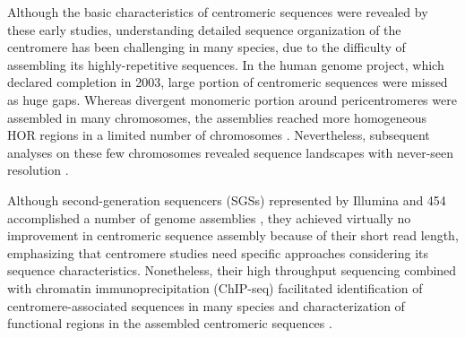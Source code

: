 Although the basic characteristics of centromeric sequences were revealed by these early studies, understanding detailed sequence organization of the centromere has been challenging in many species, due to the difficulty of assembling its highly-repetitive sequences. In the human genome project, which declared completion in 2003, large portion of centromeric sequences were missed as huge gaps. Whereas divergent monomeric portion around pericentromeres were assembled in many chromosomes, the assemblies reached more homogeneous HOR regions in a limited number of chromosomes \cite{M.KatharineRuddand2004, She2004}. Nevertheless, subsequent analyses on these few chromosomes revealed sequence landscapes with never-seen resolution \cite{Schueler2001, Ross2005, Nusbaum2006, Rudd2006}.

Although second-generation sequencers (SGSs) represented by Illumina and 454 accomplished a number of genome assemblies \cite{Schatz2010}, they achieved virtually no improvement in centromeric sequence assembly because of their short read length, emphasizing that centromere studies need specific approaches considering its sequence characteristics. Nonetheless, their high throughput sequencing combined with chromatin immunoprecipitation (ChIP-seq) facilitated identification of centromere-associated sequences in many species \cite{} and characterization of functional regions in the assembled centromeric sequences \cite{Hayden2013}.

